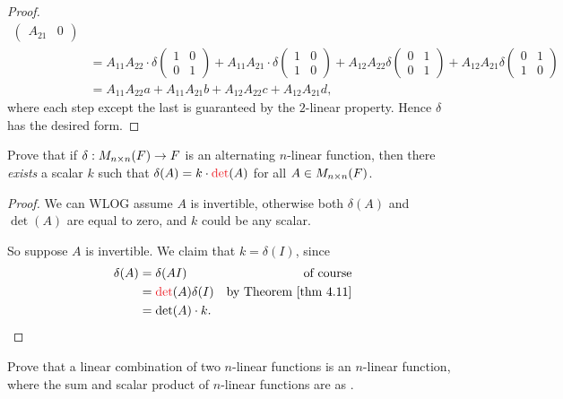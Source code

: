\begin{proof}
\begin{align*}
\begin{pmatrix}
        A_{21} & 0
    \end{pmatrix} \\
    & = A_{11} A_{22} \cdot \delta \begin{pmatrix}
        1 & 0 \\
        0 & 1
    \end{pmatrix}
    + A_{11} A_{21} \cdot \delta \begin{pmatrix}
        1 & 0 \\
        1 & 0
    \end{pmatrix}
    + A_{12} A_{22} \delta \begin{pmatrix}
        0 & 1 \\
        0 & 1
    \end{pmatrix}
    + A_{12} A_{21} \delta \begin{pmatrix}
        0 & 1 \\
        1 & 0
    \end{pmatrix} \\
    & = A_{11} A_{22} a + A_{11} A_{21} b + A_{12} A_{22} c + A_{12} A_{21} d,
\end{align*}
where each step except the last is guaranteed by the \(2\)-linear property.
Hence \(\delta\) has the desired form.
\end{proof}

\begin{exercise} \label{exercise 4.5.16}
Prove that if \(\delta: M_{n \times n}(F) \to F\) is an alternating \(n\)-linear function, then there \emph{exists} a scalar \(k\) such that \(\delta(A) = k \cdot \RED{\det}(A)\) for all \(A \in M_{n \times n}(F)\).
\end{exercise}

\begin{proof}
We can WLOG assume \(A\) is invertible, otherwise both \(\delta(A)\) and \(\det(A)\) are equal to zero, and \(k\) could be any scalar.

So suppose \(A\) is invertible.
We claim that \(k = \delta(I)\), since
\begin{align*}
    \delta(A) & = \delta(AI) & \text{of course} \\
              & = \RED{\det}(A) \delta(I) & \text{by \THM{4.11}} \\
              & = \det(A) \cdot k.
\end{align*}
\end{proof}

\begin{exercise} \label{exercise 4.5.17}
Prove that a linear combination of two \(n\)-linear functions is an \(n\)-linear function, where the sum and scalar product of \(n\)-linear functions are as .
\end{exercise}

